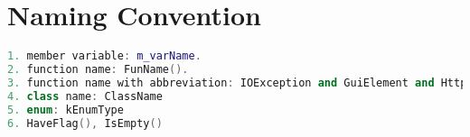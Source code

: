 
\chapter{Naming Convention}

\begin{lstlisting}[language=C++]
1. member variable: m_varName.
2. function name: FunName().
3. function name with abbreviation: IOException and GuiElement and HttpServer
4. class name: ClassName
5. enum: kEnumType
6. HaveFlag(), IsEmpty()
\end{lstlisting}